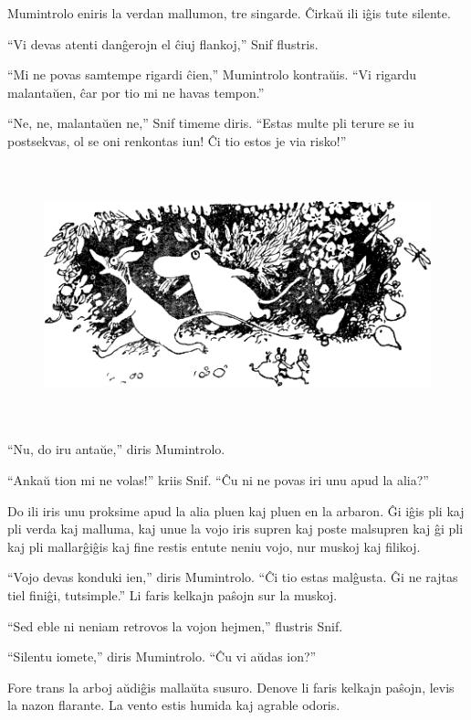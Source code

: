 Mumintrolo eniris la verdan mallumon, tre singarde. Ĉirkaŭ ili iĝis tute silente.

``Vi devas atenti danĝerojn el ĉiuj flankoj,'' Snif flustris.

``Mi ne povas samtempe rigardi ĉien,'' Mumintrolo kontraŭis. ``Vi rigardu malantaŭen, ĉar por tio mi ne havas tempon.''

``Ne, ne, malantaŭen ne,'' Snif timeme diris. ``Estas multe pli terure se iu postsekvas, ol se oni renkontas iun! Ĉi tio estos je via risko!''

\begin{figure}[htbp]
\centering
\includegraphics[width=450pt,height=214pt]{1-3.png}
\caption{}
\label{1-3}
\end{figure}

``Nu, do iru antaŭe,'' diris Mumintrolo.

``Ankaŭ tion mi ne volas!'' kriis Snif. ``Ĉu ni ne povas iri unu apud la alia?''

Do ili iris unu proksime apud la alia pluen kaj pluen en la arbaron. Ĝi iĝis pli kaj pli verda kaj malluma, kaj unue la vojo iris supren kaj poste malsupren kaj ĝi pli kaj pli mallarĝiĝis kaj fine restis entute neniu vojo, nur muskoj kaj filikoj.

``Vojo devas konduki ien,'' diris Mumintrolo. ``Ĉi tio estas malĝusta. Ĝi ne rajtas tiel finiĝi, tutsimple.'' Li faris kelkajn paŝojn sur la muskoj.

``Sed eble ni neniam retrovos la vojon hejmen,'' flustris Snif.

``Silentu iomete,'' diris Mumintrolo. ``Ĉu vi aŭdas ion?''

Fore trans la arboj aŭdiĝis mallaŭta susuro. Denove li faris kelkajn paŝojn, levis la nazon flarante. La vento estis humida kaj agrable odoris.

